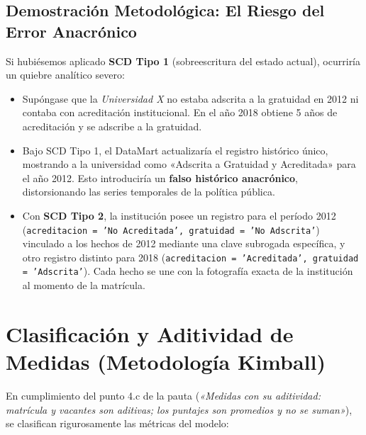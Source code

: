 \documentclass[11pt,a4paper]{article}
\begin{document}
\subsection{Demostración Metodológica: El Riesgo del Error Anacrónico}
Si hubiésemos aplicado \textbf{SCD Tipo 1} (sobreescritura del estado actual), ocurriría un quiebre analítico severo:
\begin{itemize}[leftmargin=*]
    \item Supóngase que la \textit{Universidad X} no estaba adscrita a la gratuidad en 2012 ni contaba con acreditación institucional. En el año 2018 obtiene 5 años de acreditación y se adscribe a la gratuidad.
    \item Bajo SCD Tipo 1, el DataMart actualizaría el registro histórico único, mostrando a la universidad como «Adscrita a Gratuidad y Acreditada» para el año 2012. Esto introduciría un \textbf{falso histórico anacrónico}, distorsionando las series temporales de la política pública.
    \item Con \textbf{SCD Tipo 2}, la institución posee un registro para el período 2012 (\texttt{acreditacion = 'No Acreditada', gratuidad = 'No Adscrita'}) vinculado a los hechos de 2012 mediante una clave subrogada específica, y otro registro distinto para 2018 (\texttt{acreditacion = 'Acreditada', gratuidad = 'Adscrita'}). Cada hecho se une con la fotografía exacta de la institución al momento de la matrícula.
\end{itemize}

\section{Clasificación y Aditividad de Medidas (Metodología Kimball)}
\label{sec:aditividad}

En cumplimiento del punto 4.c de la pauta (\textit{«Medidas con su aditividad: matrícula y vacantes son aditivas; los puntajes son promedios y no se suman»}), se clasifican rigurosamente las métricas del modelo:
\end{document}
